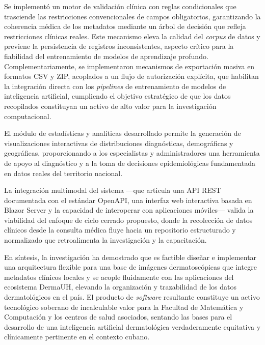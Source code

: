 \begin{conclusions}
Se implementó un motor de validación clínica con reglas condicionales que trasciende las restricciones 
convencionales de campos obligatorios, garantizando la coherencia médica de los metadatos mediante un 
árbol de decisión que refleja restricciones clínicas reales. Este mecanismo eleva la calidad del 
\textit{corpus} de datos y previene la persistencia de registros inconsistentes, aspecto crítico para la 
fiabilidad del entrenamiento de modelos de aprendizaje profundo. Complementariamente, se implementaron 
mecanismos de exportación masiva en formatos CSV y ZIP, acoplados a un flujo de autorización explícita, 
que habilitan la integración directa con los \textit{pipelines} de entrenamiento de modelos de 
inteligencia artificial, cumpliendo el objetivo estratégico de que los datos recopilados constituyan un 
activo de alto valor para la investigación computacional.

El módulo de estadísticas y analíticas desarrollado permite la generación de visualizaciones interactivas 
de distribuciones diagnósticas, demográficas y geográficas, proporcionando a los especialistas y 
administradores una herramienta de apoyo al diagnóstico y a la toma de decisiones epidemiológicas 
fundamentada en datos reales del territorio nacional.

La integración multimodal del sistema ---que articula una API REST documentada con el estándar OpenAPI, 
una interfaz web interactiva basada en Blazor Server y la capacidad de interoperar con aplicaciones 
móviles--- valida la viabilidad del enfoque de ciclo cerrado propuesto, donde la recolección de datos 
clínicos desde la consulta médica fluye hacia un repositorio estructurado y normalizado que retroalimenta 
la investigación y la capacitación.

En síntesis, la investigación ha demostrado que es factible diseñar e implementar una arquitectura 
flexible para una base de imágenes dermatoscópicas que integre metadatos clínicos locales y se acople 
fluidamente con las aplicaciones del ecosistema DermaUH, elevando la organización y trazabilidad de los 
datos dermatológicos en el país. El producto de \textit{software} resultante constituye un activo 
tecnológico soberano de incalculable valor para la Facultad de Matemática y Computación y los centros 
de salud asociados, sentando las bases para el desarrollo de una inteligencia artificial dermatológica 
verdaderamente equitativa y clínicamente pertinente en el contexto cubano.
\end{conclusions}
